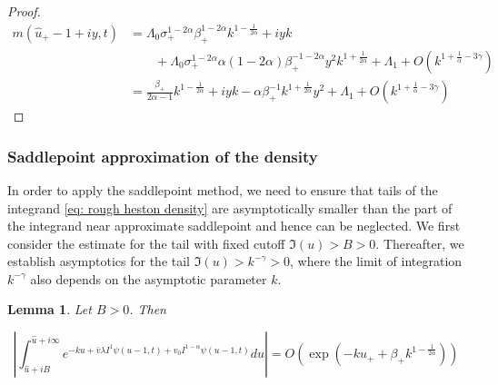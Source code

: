 \documentclass[12pt,twoside]{article}
\theoremstyle{plain}
\theoremstyle{plain}
\newtheorem{lemma}[proposition]{Lemma}
\theoremstyle{definition}
\theoremstyle{remark}
\numberwithin{equation}{section}
\begin{document}
\begin{proof}
$$
\begin{aligned}
m(\hat u_+ - 1 + iy,t)&=\Lambda_0\sigma_+^{1-2\alpha}\beta_+^{1-2\alpha}k^{1-\frac{1}{2\alpha}} + iyk \\
&\qquad + \Lambda_0 \sigma_+ ^{1-2\alpha} \alpha(1-2\alpha) \beta_+^{-1-2\alpha} y^2 k^{1 + \frac{1}{2\alpha}} + \Lambda_1 + O(k^{1+\frac 1\alpha -3\gamma})\\[10pt]
&=\frac{\beta_+}{2\alpha - 1} k ^ {1-\frac{1}{2\alpha}} + iyk - \alpha \beta_+^{-1}  k ^{1+\frac{1}{2\alpha}} y^2 + \Lambda_1+ O(k^{1+\frac 1\alpha -3\gamma})
\end{aligned}
$$

\end{proof}

\subsubsection{Saddlepoint approximation of the density}

In order to apply the saddlepoint method, we need to ensure that tails of the integrand \eqref{eq: rough heston density} are asymptotically smaller than the part of the integrand near approximate saddlepoint and hence can be neglected. We first consider the estimate for the tail with fixed cutoff $\Im (u) > B > 0$. Thereafter, we establish asymptotics for the tail $\Im (u) > k^{-\gamma} > 0$, where the limit of integration $k^{-\gamma}$ also depends on the asymptotic parameter $k$.

\begin{lemma}

Let $B>0$. Then

\begin{equation}
\label{eq: tails for fixed B}
\left|\int_{\hat{u}+i B}^{\hat{u}+i \infty} e^{-ku+\bar{v} \lambda I^{1} \psi(u-1, t)+v_{0} I^{1-\alpha} \psi(u-1, t)} d u\right|
=O\left(\exp \left(-ku_+ +\beta_+ k^{1 -\frac{1}{2\alpha}}\right)\right)
\end{equation}

\end{lemma}
\end{document}

